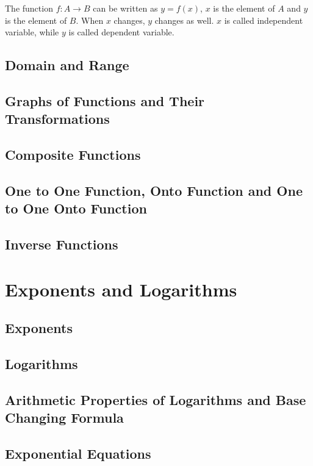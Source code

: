 \documentclass{report}
\begin{document}
\begin{multicols}{2}
  The function $f: A \to B$ can be written as $y = f(x)$, $x$ is the element of
  $A$ and $y$ is the element of $B$. When $x$ changes, $y$ changes as well. $x$
  is called independent variable, while $y$ is called dependent variable.

  \section{Domain and Range}

  \section{Graphs of Functions and Their Transformations}

  \section{Composite Functions}

  \section{One to One Function, Onto Function and One to One Onto Function}

  \section{Inverse Functions}

  \chapter{Exponents and Logarithms}

  \section{Exponents}

  \section{Logarithms}

  \section{Arithmetic Properties of Logarithms and Base Changing Formula}

  \section{Exponential Equations}


\end{multicols}
\end{document}
